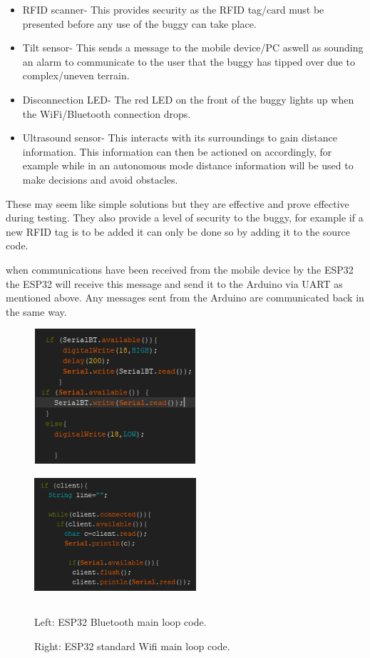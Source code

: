 \documentclass[8pt, a4paper]{article}
\begin{document}
\begin{itemize}
	\item RFID scanner- This provides security as the RFID tag/card must be presented before any use of the buggy can take place. 
	\item Tilt sensor- This sends a message to the mobile device/PC aswell as sounding an alarm to communicate to the user that the buggy has tipped over due to complex/uneven terrain. 
	\item Disconnection LED- The red LED on the front of the buggy lights up when the WiFi/Bluetooth connection drops.  
	\item Ultrasound sensor- This interacts with its surroundings to gain distance information. This information can then be actioned on accordingly, for example while in an autonomous mode distance information will be used to make decisions and avoid obstacles. 
\end{itemize}
These may seem like simple solutions but they are effective and prove effective during testing. They also provide a level of security to the buggy, for example if a new RFID tag is to be added it can only be done so by adding it to the source code.  

when communications have been received from the mobile device by the ESP32 the ESP32 will receive this message and send it to the Arduino via UART as mentioned above. Any messages sent from the Arduino are communicated back in the same way. 
 
\begin{figure}[H]
	\centering
	\includegraphics[height=5.0cm, width=6.0cm]{bluetooth}
	\includegraphics[height=5.0cm, width=6.0cm]{standard_wifi}
	\caption{Left: ESP32 Bluetooth main loop code.}
	\caption{Right: ESP32 standard Wifi main loop code.}
\end{figure}
\end{document}
